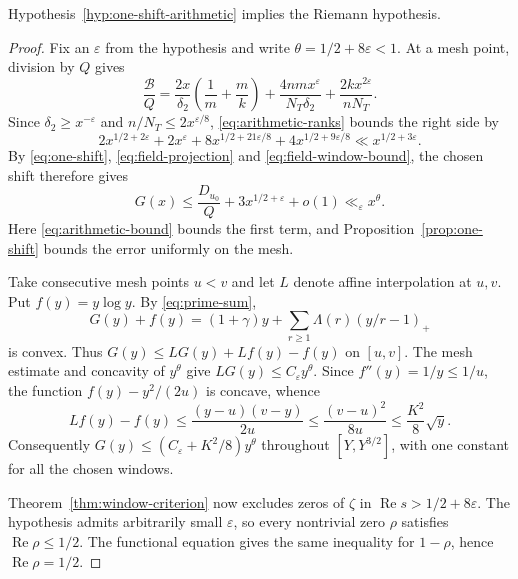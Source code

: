 \begin{theorem}\label{thm:arithmetic-rh}
Hypothesis~\ref{hyp:one-shift-arithmetic} implies the Riemann hypothesis.
\end{theorem}

\begin{proof}
Fix an $\varepsilon$ from the hypothesis and write
$\theta=1/2+8\varepsilon<1$. At a mesh point, division by $Q$ gives
\[
  \frac{\mathcal B}{Q}
   =\frac{2x}{\delta_2}\left(\frac1m+\frac m k\right)
     +\frac{4nm x^\varepsilon}{N_T\delta_2}
     +\frac{2k x^{2\varepsilon}}{nN_T}.
\]
Since $\delta_2\ge x^{-\varepsilon}$ and $n/N_T\le2x^{\varepsilon/8}$,
\eqref{eq:arithmetic-ranks} bounds the right side by
\[
  2x^{1/2+2\varepsilon}+2x^\varepsilon
  +8x^{1/2+21\varepsilon/8}+4x^{1/2+9\varepsilon/8}
  \ll x^{1/2+3\varepsilon}.
\]
By \eqref{eq:one-shift}, \eqref{eq:field-projection} and
\eqref{eq:field-window-bound}, the chosen shift therefore gives
\[
  G(x)\le\frac{D_{u_0}}{Q}+3x^{1/2+\varepsilon}+o(1)
       \ll_{\varepsilon} x^\theta .
\]
Here \eqref{eq:arithmetic-bound} bounds the first term, and
Proposition~\ref{prop:one-shift} bounds the error uniformly on the mesh.

Take consecutive mesh points $u<v$ and let $L$ denote affine
interpolation at $u,v$. Put $f(y)=y\log y$. By \eqref{eq:prime-sum},
\[
  G(y)+f(y)=(1+\gamma)y+\sum_{r\ge1}\Lambda(r)(y/r-1)_+
\]
is convex. Thus $G(y)\le LG(y)+Lf(y)-f(y)$ on $[u,v]$.
The mesh estimate and concavity of $y^\theta$ give
$LG(y)\le C_\varepsilon y^\theta$. Since $f''(y)=1/y\le1/u$,
the function $f(y)-y^2/(2u)$ is concave, whence
\[
  Lf(y)-f(y)\le\frac{(y-u)(v-y)}{2u}
        \le\frac{(v-u)^2}{8u}\le\frac{K^2}{8}\sqrt y .
\]
Consequently $G(y)\le(C_\varepsilon+K^2/8)y^\theta$ throughout
$[Y,Y^{3/2}]$, with one constant for all the chosen windows.

Theorem~\ref{thm:window-criterion} now excludes zeros of $\zeta$ in
$\operatorname{Re}s>1/2+8\varepsilon$. The hypothesis admits
arbitrarily small $\varepsilon$, so every nontrivial zero $\rho$
satisfies $\operatorname{Re}\rho\le1/2$. The functional equation gives
the same inequality for $1-\rho$, hence $\operatorname{Re}\rho=1/2$.
\end{proof}
